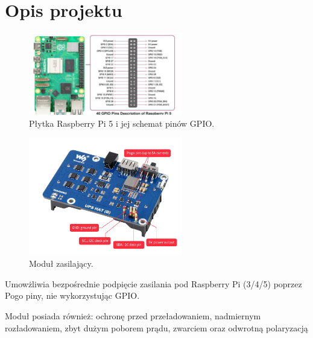 \documentclass[magisterska]{pracadypl}
\begin{document}
\chapter{Opis projektu}

\begin{figure}[H]  %
    \centering  %
    \includegraphics[width=0.6\textwidth]{images/RPI-PIN.jpg}  %
    \captionsetup{font=footnotesize}
    \caption[Płytka Raspberry Pi 5 i jej schemat pinów GPIO. https://www.hackatronic.com/wp-content/uploads/2024/03/Raspberry-Pi-5-Pinout--1210x642.jpg]{Płytka Raspberry Pi 5 i jej schemat pinów GPIO.}
\end{figure}

\begin{figure}[H]  %
    \centering  %
    \includegraphics[width=0.6\textwidth]{images/ups-hat.jpg}  %
    \captionsetup{font=footnotesize}
    \caption[Moduł zasilający. https://www.waveshare.com/wiki/UPS-HAT-(B)]{Moduł zasilający.}
\end{figure}

Umowżliwia bezpośrednie podpięcie zasilania pod Raspberry Pi (3/4/5) poprzez Pogo piny, nie wykorzystując GPIO.

Moduł posiada również: ochronę przed przeładowaniem, nadmiernym rozładowaniem, zbyt dużym poborem prądu, zwarciem oraz odwrotną polaryzacją
\end{document}
